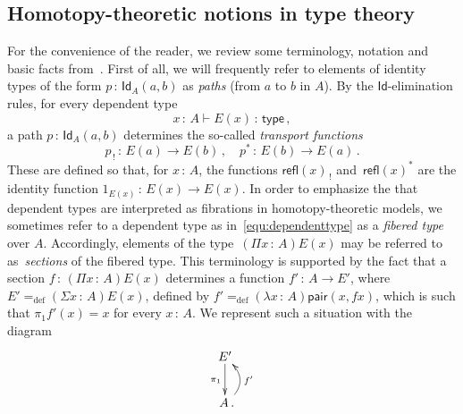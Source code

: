 \documentclass[10pt,a4paper,oneside,reqno]{amsart}
\numberwithin{equation}{section}
\theoremstyle{mythm}
\theoremstyle{mydef}
\theoremstyle{myrmk}
\newcommand{\defeq}{=_{\mathrm{def}}}
\newcommand{\co}{\,{:}\,}
\newcommand{\type}{\mathsf{type}}
\newcommand{\Id}{\mathsf{Id}}
\newcommand{\refl}{\mathsf{refl}}
\newcommand{\pair}{\mathsf{pair}}
\begin{document}
\subsection*{Homotopy-theoretic notions in type theory} For the convenience of the reader, 
we review some terminology, notation  and basic facts from~\cite{hott,VoevodskyV:notts}. 
First of all, we will frequently refer to elements of identity types of the form 
$p \co \Id_A(a,b)$ as \emph{paths} (from $a$ to $b$ in $A$). By the $\Id$-elimination rules, 
for every dependent type
\begin{equation}
\label{equ:dependenttype}
x\co A \vdash E(x) \co \type \, ,
\end{equation} 
a path $p\co \Id_A(a,b)$ determines the so-called \emph{transport functions} 
\[
p_{\, ! } \co E(a) \rightarrow E(b) \, , \quad p^* \co E(b) \to E(a) \, .
\] 
These are defined so that, for $x \co A$, the functions $\refl(x)_{\, !}$ 
and~$\refl(x)^*$ are the identity function $1_{E(x)} \co E(x) \to E(x)$.  In order to emphasize the 
that dependent types are interpreted as fibrations in homotopy-theoretic models, we sometimes refer to a dependent
type as in~\eqref{equ:dependenttype} as a \emph{fibered type} over $A$. Accordingly, elements of the 
type~$(\Pi x \co A)E(x)$ may be referred to as~\emph{sections} of the fibered type. This terminology is supported by the fact that a section $f \co (\Pi x \co A)E(x)$ determines a function $f' \co A \to E'$, where $E' \defeq (\Sigma x \co A)E(x)$, defined by
$f' \defeq (\lambda x \co A) \pair(x, fx)$, which is such that $ \pi_1 f'(x) = x$ for every $x \co A$.  We represent such a situation with the diagram
  \[
   \xymatrix{
    E' \ar[d]_{\pi_1} \\
    \;  A \, . \ar@/_1pc/[u]_{f'} }
     \]
\end{document}
